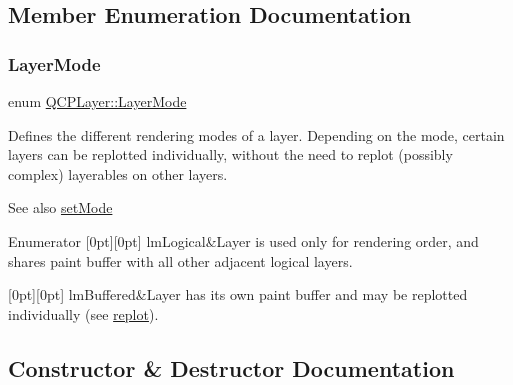 \subsection{Member Enumeration Documentation}
\mbox{\label{class_q_c_p_layer_a67dcfc1590be2a1f2227c5a39bb59c7c}} 
\subsubsection{\texorpdfstring{LayerMode}{LayerMode}}
{\footnotesize\ttfamily enum \mbox{\hyperlink{class_q_c_p_layer_a67dcfc1590be2a1f2227c5a39bb59c7c}{Q\+C\+P\+Layer\+::\+Layer\+Mode}}}

Defines the different rendering modes of a layer. Depending on the mode, certain layers can be replotted individually, without the need to replot (possibly complex) layerables on other layers.

\begin{DoxySeeAlso}{See also}
\mbox{\hyperlink{class_q_c_p_layer_a938d57b04f4e4c23cedf1711f983919b}{set\+Mode}} 
\end{DoxySeeAlso}
\begin{DoxyEnumFields}{Enumerator}
[0pt][0pt]{}\mbox{\label{class_q_c_p_layer_a67dcfc1590be2a1f2227c5a39bb59c7ca02eb5e9a4cb7f1baf1e2b6b99e3b87ce}} 
lm\+Logical&Layer is used only for rendering order, and shares paint buffer with all other adjacent logical layers. \\
\hline

[0pt][0pt]{}\mbox{\label{class_q_c_p_layer_a67dcfc1590be2a1f2227c5a39bb59c7cab581b9fab3007c4c65f057f4185d7538}} 
lm\+Buffered&Layer has its own paint buffer and may be replotted individually (see \mbox{\hyperlink{class_q_c_p_layer_adefd53b6db02f470151c416f42e37180}{replot}}). \\
\hline

\end{DoxyEnumFields}


\subsection{Constructor \& Destructor Documentation}
\mbox{\label{class_q_c_p_layer_a5d0657fc86d624e5efbe930ef21af718}} 

